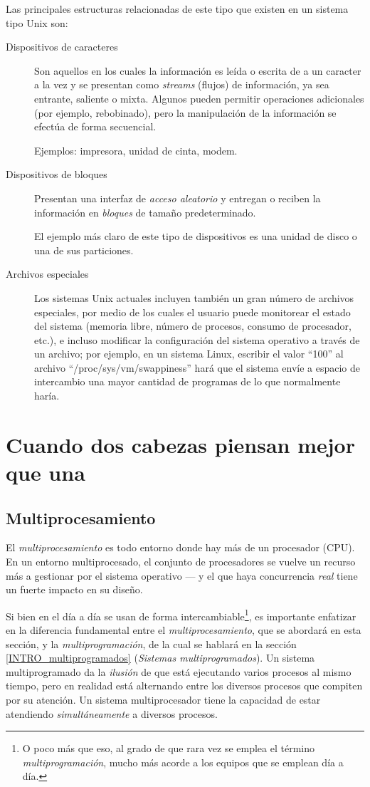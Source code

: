 \documentclass[11pt,fleqn]{book} %
\begin{document}
Las principales estructuras relacionadas de este tipo que existen en un
sistema tipo Unix son:

\begin{description}
\item[Dispositivos de caracteres] Son aquellos en los cuales la
     información es leída o escrita de a un caracter a la vez y se
     presentan como \emph{streams} (flujos) de información, ya sea
     entrante, saliente o mixta. Algunos pueden permitir operaciones
     adicionales (por ejemplo, rebobinado), pero la manipulación de la
     información se efectúa de forma secuencial.

     Ejemplos: impresora, unidad de cinta, modem.
\item[Dispositivos de bloques] Presentan una interfaz
     de \emph{acceso aleatorio} y entregan o reciben la información en
     \emph{bloques} de tamaño predeterminado.

     El ejemplo más claro de este tipo de dispositivos es una unidad
     de disco o una de sus particiones.
\item[Archivos especiales] Los sistemas Unix actuales incluyen también
  un gran número de archivos especiales, por medio de los cuales el usuario puede
  monitorear el estado del sistema (memoria libre, número de procesos,
  consumo de procesador, etc.), e incluso modificar la configuración
  del sistema operativo a través de un archivo; por ejemplo, en un sistema Linux,
  escribir el valor ``100'' al archivo ``/proc/sys/vm/swappiness'' hará
  que el sistema envíe a espacio de intercambio una mayor cantidad de
  programas de lo que normalmente haría.
\end{description}
\section{Cuando dos cabezas piensan mejor que una}
\label{sec-2-9}
\subsection{Multiprocesamiento}
\label{sec-2-9-1}


El \emph{multiprocesamiento} es todo entorno donde hay más de un procesador
(CPU). En un entorno multiprocesado, el conjunto de procesadores se
vuelve un recurso más a gestionar por el sistema operativo — y el que
haya concurrencia \emph{real} tiene un fuerte impacto en su diseño.

Si bien en el día a día se usan de forma intercambiable\footnote{O poco
más que eso, al grado de que rara vez se emplea el término
\emph{multiprogramación}, mucho más acorde a los equipos que se emplean día
a día. }, es importante enfatizar en la diferencia fundamental entre el
\emph{multiprocesamiento}, que se abordará en esta sección, y la
\emph{multiprogramación}, de la cual se hablará en la sección
\ref{INTRO_multiprogramados} (\emph{Sistemas multiprogramados}). Un sistema
multiprogramado da la \emph{ilusión} de que está ejecutando varios
procesos al mismo tiempo, pero en realidad está alternando entre los
diversos procesos que compiten por su atención. Un sistema
multiprocesador tiene la capacidad de estar atendiendo
\emph{simultáneamente} a diversos procesos.
\end{document}
